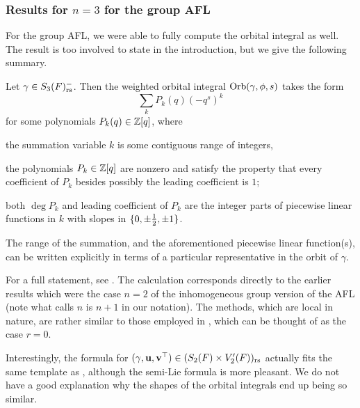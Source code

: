 \subsubsection{Results for $n=3$ for the group AFL}
\label{sec:results_group_AFL}
For the group AFL, we were able to fully compute the orbital integral as well.
The result is too involved to state in the introduction,
but we give the following summary.
\begin{theorem}
  \label{thm:summary}
  Let $\gamma \in S_3(F)_{\mathrm{rs}}^-$.
  Then the weighted orbital integral $\operatorname{Orb}(\gamma, \phi, s)$ takes the form
  \[ \sum_k P_k(q) (-q^s)^k \]
  for some polynomials $P_k(q) \in \mathbb Z[q]$, where
  \begin{itemize}
    \ii the summation variable $k$ is some contiguous range of integers,

    \ii the polynomials $P_k \in \mathbb Z[q]$ are nonzero and satisfy the property
    that every coefficient of $P_k$ besides possibly the leading coefficient is $1$;

    \ii both $\deg P_k$ and leading coefficient of $P_k$ are the integer parts
    of piecewise linear functions in $k$ with slopes in $\{0, \pm\frac{1}{2}, \pm 1\}$.
  \end{itemize}
  The range of the summation, and the aforementioned piecewise linear function(s),
  can be written explicitly in terms of a particular representative
  in the orbit of $\gamma$.
\end{theorem}
For a full statement, see
.
The calculation corresponds directly to the earlier results
\cite[Lemma 7.1.1 and Proposition 7.3.2]{ref:AFLspherical}
which were the case $n = 2$ of the inhomogeneous group version of the AFL
(note what \cite{ref:AFLspherical} calls $n$ is $n+1$ in our notation).
The methods, which are local in nature,
are rather similar to those employed in \cite{ref:AFL},
which can be thought of as the case $r = 0$.

\begin{remark}
  Interestingly, the formula 
  for ${(\gamma, \mathbf u, \mathbf v^\top)} \in (S_2(F) \times V'_2(F))_{\mathrm{rs}}$
  actually fits the same template as ,
  although the semi-Lie formula is more pleasant.
  We do not have a good explanation why the shapes of the orbital integrals
  end up being so similar.
\end{remark}

